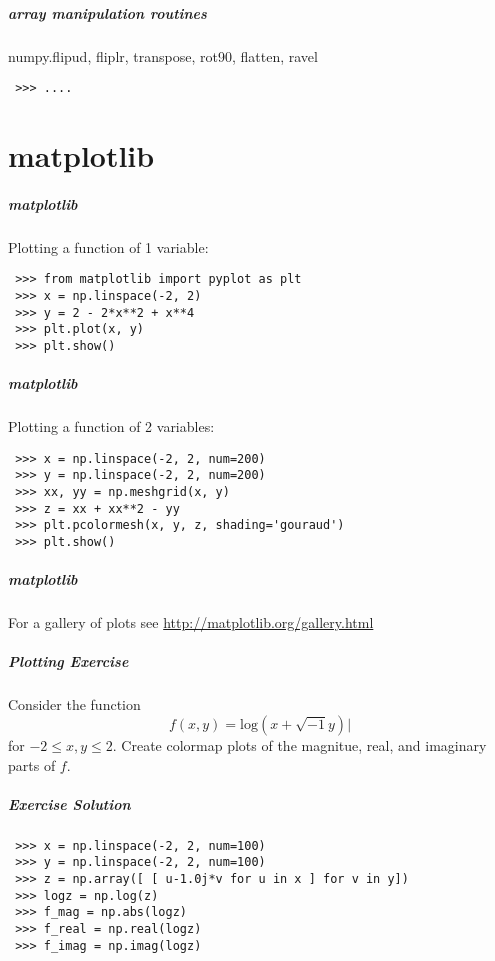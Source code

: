 \documentclass[hyperref={colorlinks, linkcolor=blue, urlcolor=blue}]{beamer}
\begin{document}
\begin{frame}[fragile]
  \frametitle{array manipulation routines}
  numpy.flipud, fliplr, transpose, rot90, flatten, ravel
  \begin{lstlisting}
 >>> ....
  \end{lstlisting}
\end{frame}

\part{matplotlib} 

\begin{frame}[fragile]
  \frametitle{matplotlib}
  Plotting a function of 1 variable:
  \begin{lstlisting}
 >>> from matplotlib import pyplot as plt
 >>> x = np.linspace(-2, 2)
 >>> y = 2 - 2*x**2 + x**4
 >>> plt.plot(x, y)
 >>> plt.show()
  \end{lstlisting}
\end{frame}

\begin{frame}[fragile]
  \frametitle{matplotlib}
  Plotting a function of 2 variables:
  \begin{lstlisting}
 >>> x = np.linspace(-2, 2, num=200)
 >>> y = np.linspace(-2, 2, num=200)
 >>> xx, yy = np.meshgrid(x, y)
 >>> z = xx + xx**2 - yy
 >>> plt.pcolormesh(x, y, z, shading='gouraud')
 >>> plt.show()
  \end{lstlisting}
\end{frame}

\begin{frame}
  \frametitle{matplotlib}
  For a gallery of plots see
  \url{http://matplotlib.org/gallery.html} 
\end{frame}

\begin{frame}
  \frametitle{Plotting Exercise}
  Consider the function 
  \[ f(x,y) = \mathrm{log}(x+\sqrt{-1}y)| \]
  for $-2 \leq x,y \leq 2$.
  Create colormap plots of the magnitue, real, and imaginary parts of $f$.
\end{frame}

\begin{frame}[fragile]
  \frametitle{Exercise Solution}

  \begin{lstlisting}
 >>> x = np.linspace(-2, 2, num=100)
 >>> y = np.linspace(-2, 2, num=100)
 >>> z = np.array([ [ u-1.0j*v for u in x ] for v in y])
 >>> logz = np.log(z)
 >>> f_mag = np.abs(logz)
 >>> f_real = np.real(logz)
 >>> f_imag = np.imag(logz)
  \end{lstlisting}
\end{frame}
\end{document}
